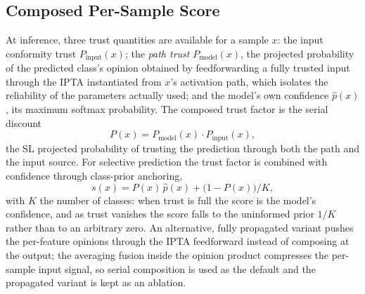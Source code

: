 \subsection{Composed Per-Sample Score}
\label{sec:composed}
At inference, three trust quantities are available for a sample $x$: the input conformity trust $P_{\mathrm{input}}(x)$; the \emph{path trust} $P_{\mathrm{model}}(x)$, the projected probability of the predicted class's opinion obtained by feedforwarding a fully trusted input through the \ac{IPTA} instantiated from $x$'s activation path, which isolates the reliability of the parameters actually used; and the model's own confidence $\hat{p}(x)$, its maximum softmax probability. The composed trust factor is the serial discount
\[
P(x) = P_{\mathrm{model}}(x) \cdot P_{\mathrm{input}}(x),
\]
the \ac{SL} projected probability of trusting the prediction through both the path and the input source. For selective prediction the trust factor is combined with confidence through class-prior anchoring,
\[
s(x) = P(x)\, \hat{p}(x) + \big(1 - P(x)\big)/K,
\]
with $K$ the number of classes: when trust is full the score is the model's confidence, and as trust vanishes the score falls to the uninformed prior $1/K$ rather than to an arbitrary zero. An alternative, fully propagated variant pushes the per-feature opinions through the \ac{IPTA} feedforward instead of composing at the output; the averaging fusion inside the opinion product compresses the per-sample input signal, so serial composition is used as the default and the propagated variant is kept as an ablation.

